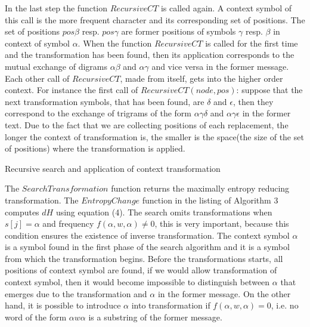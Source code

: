 \documentclass[smallabstract,smallcaptions]{dccpaper}
\begin{document}
In the last step the function $RecursiveCT$ is called again. A context symbol of this call is the more frequent character and its corresponding set of positions. The set of positions $pos\beta$ resp. $pos\gamma$ are former positions of symbols $\gamma$ resp. $\beta$ in context of symbol $\alpha$. When the function $RecursiveCT$ is called for the first time and the transformation has been found, then its application corresponds to the mutual exchange of digrams $\alpha\beta$ and $\alpha\gamma$ and vice versa in the former message. Each other call of $RecursiveCT$, made from itself, gets into the higher order context. For instance the first call of $RecursiveCT(node, pos)$: suppose that the next transformation symbols, that has been found, are $\delta$ and $\epsilon$, then they correspond to the exchange of trigrams of the form $\alpha\gamma\delta$ and $\alpha\gamma\epsilon$ in the former text. Due to the fact that we are collecting positions of each replacement, the longer the context of transformation is, the smaller is the space(the size of the set of positions) where the transformation is applied.

\begin{algorithm}
\caption{Recursive search and application of context transformation}
\label{alg:max-ent-rec}
\end{algorithm}

The $SearchTransformation$ function returns the maximally entropy reducing transformation. The $EntropyChange$ function in the listing of Algorithm 3 computes $dH$ using equation (4).
The search omits transformations when $s[j] = \alpha$ and frequency $f(\alpha,w,\alpha)$, this is very important, because this condition ensures the existence of inverse transformation. The context symbol $\alpha$ is a symbol found in the first phase of the search algorithm and it is a symbol from which the transformation begins. Before the transformations starts, all positions of context symbol are found, if we would allow transformation of context symbol, then it would become impossible to distinguish between $\alpha$ that emerges due to the transformation and $\alpha$ in the former message. On the other hand, it is possible to introduce $\alpha$ into transformation if $f(\alpha,w,\alpha) = 0$, i.e. no word of the form $\alpha w \alpha$ is a substring of the former message.
\end{document}
